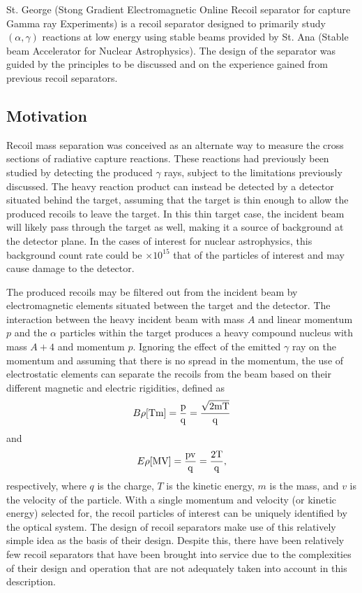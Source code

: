 
St. George (Stong Gradient Electromagnetic Online Recoil separator for capture
Gamma ray Experiments) is a recoil separator designed to primarily study
$(\alpha,\gamma)$ reactions at low energy using stable beams provided by St.
Ana (Stable beam Accelerator for Nuclear Astrophysics). The design of the
separator was guided by the principles to be discussed and on the experience
gained from previous recoil separators.


\subsection{Motivation}

Recoil mass separation was conceived as an alternate way to measure the cross
sections of radiative capture reactions. These reactions had previously been
studied by detecting the produced $\gamma$ rays, subject to the limitations
previously discussed. The heavy reaction product can instead be detected by a
detector situated behind the target, assuming that the target is thin enough to
allow the produced recoils to leave the target. In this thin target case, the
incident beam will likely pass through the target as well, making it a source
of background at the detector plane. In the cases of interest for nuclear
astrophysics, this background count rate could be $\times 10^{15}$ that of the
particles of interest and may cause damage to the detector.

The produced recoils may be filtered out from the incident beam by
electromagnetic elements situated between the target and the detector. The
interaction between the heavy incident beam with mass $A$ and linear momentum
$p$ and the $\alpha$ particles within
the target produces a heavy compound nucleus with mass $A + 4$ and momentum
$p$. Ignoring the effect of the emitted $\gamma$ ray on the momentum and
assuming that there is no spread in the momentum, the use of electrostatic
elements can separate the recoils from the beam based on their different
magnetic and electric rigidities, defined as
\[
    B\rho\rm{ [Tm] } = \frac{p}{q} = \frac{\sqrt{2mT}}{q}
\]
and
\[
    E\rho\rm{ [MV] } = \frac{pv}{q} = \frac{2T}{q},
\]
respectively, where $q$ is the charge, $T$ is the kinetic energy, $m$ is the
mass, and $v$ is the velocity of the particle. With a single momentum and
velocity (or kinetic energy) selected for, the recoil particles of interest can
be uniquely identified by the optical system. The design of recoil separators
make use of this relatively simple idea as the basis of their design. Despite
this, there have been relatively few recoil separators that have been brought
into service due to the complexities of their design and operation that are not
adequately taken into account in this description.


